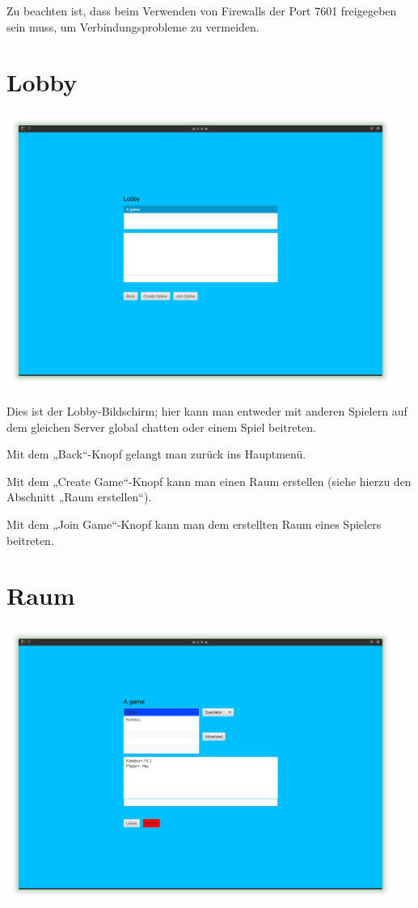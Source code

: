 \documentclass{scrreprt}
\begin{document}
Zu beachten ist, dass beim Verwenden von Firewalls der  Port 7601 freigegeben sein muss, um Verbindungsprobleme zu vermeiden.

\section{Lobby}

\includegraphics[height=9cm]{Screenshot8.png}

Dies ist der Lobby-Bildschirm; hier kann man entweder mit anderen Spielern auf dem gleichen Server global chatten oder einem
Spiel beitreten.

Mit dem „Back“-Knopf gelangt man zurück ins Hauptmenü.

Mit dem „Create Game“-Knopf kann man einen Raum erstellen (siehe hierzu den Abschnitt „Raum erstellen“).

Mit dem „Join Game“-Knopf kann man dem erstellten Raum eines Spielers beitreten.

\section{Raum}

\includegraphics[height=9cm]{Screenshot10.png}
\end{document}
